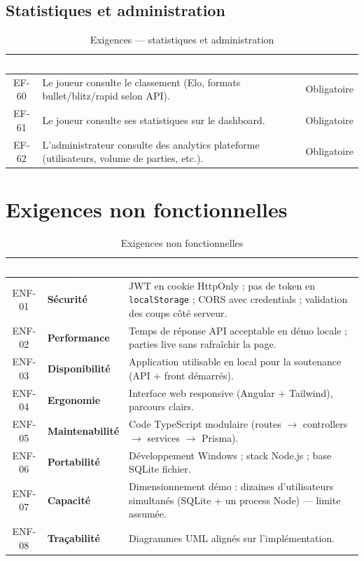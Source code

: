 \documentclass[12pt,a4paper,oneside]{article}
\begin{document}
\subsection{Statistiques et administration}
\begin{table}[H]
\centering
\caption{Exigences --- statistiques et administration}
\small
\begin{tabularx}{\linewidth}{|c|X|c|}
\hline
\rowcolor{sectionblue}
\textcolor{white}{\textbf{ID}} & \textcolor{white}{\textbf{Exigence}} & \textcolor{white}{\textbf{Priorité}} \\
\hline
EF-60 & Le joueur consulte le classement (Elo, formats bullet/blitz/rapid selon API). & Obligatoire \\
\hline
EF-61 & Le joueur consulte ses statistiques sur le dashboard. & Obligatoire \\
\hline
EF-62 & L'administrateur consulte des analytics plateforme (utilisateurs, volume de parties, etc.). & Obligatoire \\
\hline
\end{tabularx}
\end{table}

\section{Exigences non fonctionnelles}

\begin{table}[H]
\centering
\caption{Exigences non fonctionnelles}
\small
\begin{tabularx}{\linewidth}{|c|>{\bfseries}l|X|}
\hline
\rowcolor{sectionblue}
\textcolor{white}{\textbf{ID}} & \textcolor{white}{\textbf{Catégorie}} & \textcolor{white}{\textbf{Exigence}} \\
\hline
ENF-01 & Sécurité & JWT en cookie HttpOnly ; pas de token en \texttt{localStorage} ; CORS avec credentials ; validation des coups côté serveur. \\
\hline
ENF-02 & Performance & Temps de réponse API acceptable en démo locale ; parties live sans rafraîchir la page. \\
\hline
ENF-03 & Disponibilité & Application utilisable en local pour la soutenance (API + front démarrés). \\
\hline
ENF-04 & Ergonomie & Interface web responsive (Angular + Tailwind), parcours clairs. \\
\hline
ENF-05 & Maintenabilité & Code TypeScript modulaire (routes $\rightarrow$ controllers $\rightarrow$ services $\rightarrow$ Prisma). \\
\hline
ENF-06 & Portabilité & Développement Windows ; stack Node.js ; base SQLite fichier. \\
\hline
ENF-07 & Capacité & Dimensionnement démo : dizaines d'utilisateurs simultanés (SQLite + un process Node) --- limite assumée. \\
\hline
ENF-08 & Traçabilité & Diagrammes UML alignés sur l'implémentation. \\
\hline
\end{tabularx}
\end{table}
\end{document}
